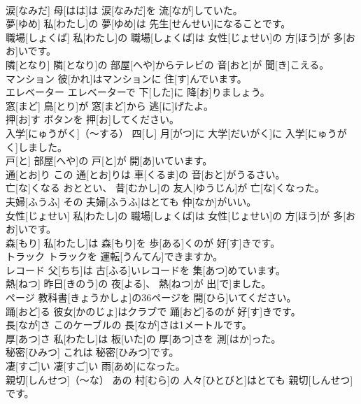 \documentclass[8pt]{extreport}
\begin{document}
\begin{CJK}{UTF8}{min}
\\	涙[なみだ]	母[はは]は 涙[なみだ]を 流[なが]していた。		
\\	夢[ゆめ]	私[わたし]の 夢[ゆめ]は 先生[せんせい]になることです。		
\\	職場[しょくば]	私[わたし]の 職場[しょくば]は 女性[じょせい]の 方[ほう]が 多[おお]いです。		
\\	隣[となり]	隣[となり]の 部屋[へや]からテレビの 音[おと]が 聞[き]こえる。		
\\	マンション	彼[かれ]はマンションに 住[す]んでいます。		
\\	エレベーター	エレベーターで 下[した]に 降[お]りましょう。		
\\	窓[まど]	鳥[とり]が 窓[まど]から 逃[に]げたよ。		
\\	押[お]す	ボタンを 押[お]してください。		
\\	入学[にゅうがく]（～する）	四[し] 月[がつ]に 大学[だいがく]に 入学[にゅうがく]しました。		
\\	戸[と]	部屋[へや]の 戸[と]が 開[あ]いています。		
\\	通[とお]り	この 通[とお]りは 車[くるま]の 音[おと]がうるさい。		
\\	亡[な]くなる	おととい、 昔[むかし]の 友人[ゆうじん]が 亡[な]くなった。		
\\	夫婦[ふうふ]	その 夫婦[ふうふ]はとても 仲[なか]がいい。		
\\	女性[じょせい]	私[わたし]の 職場[しょくば]は 女性[じょせい]の 方[ほう]が 多[おお]いです。		
\\	森[もり]	私[わたし]は 森[もり]を 歩[ある]くのが 好[す]きです。		
\\	トラック	トラックを 運転[うんてん]できますか。		
\\	レコード	父[ちち]は 古[ふる]いレコードを 集[あつ]めています。		
\\	熱[ねつ]	昨日[きのう]の 夜[よる]、 熱[ねつ]が 出[で]ました。		
\\	ページ	教科書[きょうかしょ]の36ページを 開[ひら]いてください。		
\\	踊[おど]る	彼女[かのじょ]はクラブで 踊[おど]るのが 好[す]きです。		
\\	長[なが]さ	このケーブルの 長[なが]さは1メートルです。		
\\	厚[あつ]さ	私[わたし]は 板[いた]の 厚[あつ]さを 測[はか]った。		
\\	秘密[ひみつ]	これは 秘密[ひみつ]です。		
\\	凄[すご]い	凄[すご]い 雨[あめ]になった。		
\\	親切[しんせつ]（～な）	あの 村[むら]の 人々[ひとびと]はとても 親切[しんせつ]です。		

\end{CJK}
\end{document}
